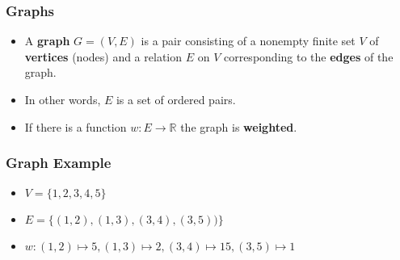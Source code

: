 \documentclass{beamer}
\begin{document}
\begin{frame}
\frametitle{Graphs}

\begin{itemize}
\item A \textbf{graph} $G  = (V,E)$ is a pair consisting of a nonempty finite set $V$ of \textbf{vertices} (nodes) and a relation $E$ on $V$ corresponding to the \textbf{edges} of the graph.
\item In other words, $E$ is a set of ordered pairs.
\item If there is a function $w: E \rightarrow \mathbb{R} $ the graph is \textbf{weighted}.
\end{itemize}
\end{frame}


\begin{frame}
\frametitle{Graph Example}
\begin{center}
\end{center}
\begin{itemize}
\item $V = \{ 1,2,3,4,5\}$
\item $E = \{(1,2), (1,3), (3,4), (3,5))\}$
\item $w: (1,2) \mapsto 5, (1,3) \mapsto 2, (3,4)\mapsto 15, (3,5)\mapsto 1$
\end{itemize}

\end{frame}

\end{document}
